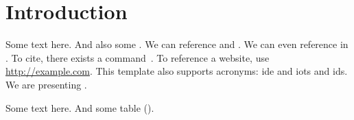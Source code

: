 \section{Introduction}
\label{sec:intro}

Some text here. And also some .
We can reference  and .
We can even reference  in . %
To cite, there exists a command~\cite{driller,fans}.
To reference a website, use \url{http://example.com}.
This template also supports acronyms: \ac{ide} and \aclp{iot} and \acfp{id}.
We are presenting \sys.




Some text here. And some table ().


